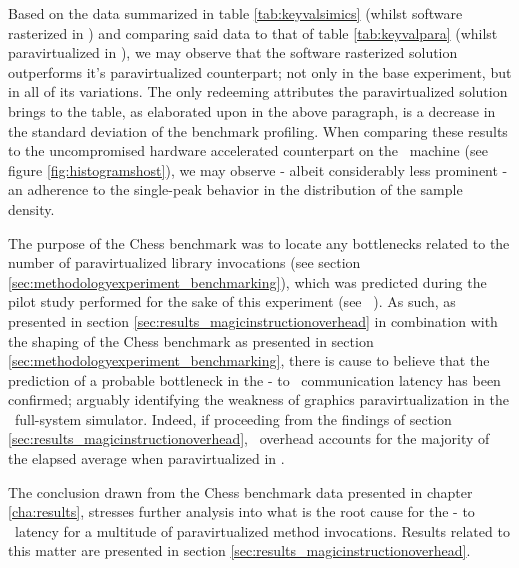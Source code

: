 Based on the data summarized in table \ref{tab:keyvalsimics} (whilst software rasterized in \dvttermsimics ) and comparing said data to that of table \ref{tab:keyvalpara} (whilst paravirtualized in \dvttermsimics ), we may observe that the software rasterized solution outperforms it's paravirtualized counterpart; not only in the base experiment, but in all of its variations.
The only redeeming attributes the paravirtualized solution brings to the table, as elaborated upon in the above paragraph, is a decrease in the standard deviation of the benchmark profiling.
When comparing these results to the uncompromised hardware accelerated counterpart on the \dvttermhost\ machine (see figure \ref{fig:histogramshost}), we may observe - albeit considerably less prominent - an adherence to the single-peak behavior in the distribution of the sample density.

The purpose of the Chess benchmark was to locate any bottlenecks related to the number of paravirtualized library invocations (see section \ref{sec:methodologyexperiment_benchmarking}), which was predicted during the pilot study performed for the sake of this experiment (see ~).
As such, as presented in section \ref{sec:results_magicinstructionoverhead} in combination with the shaping of the Chess benchmark as presented in section \ref{sec:methodologyexperiment_benchmarking}, there is cause to believe that the prediction of a probable bottleneck in the \dvttermtarget - to \dvttermhost\ communication latency has been confirmed; arguably identifying the weakness of graphics paravirtualization in the \dvttermsimics\ full-system simulator.
Indeed, if proceeding from the findings of section \ref{sec:results_magicinstructionoverhead}, \dvttermmagicinstruction\ overhead accounts for the majority of the elapsed average when paravirtualized in \dvttermsimics .


The conclusion drawn from the Chess benchmark data presented in chapter \ref{cha:results}, stresses further analysis into what is the root cause for the \dvttermtarget - to \dvttermhost\ latency for a multitude of paravirtualized method invocations.
Results related to this matter are presented in section \ref{sec:results_magicinstructionoverhead}. 



